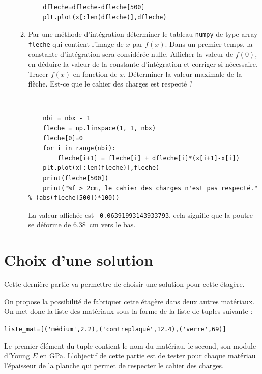 \begin{enumerate}
\begin{enumerate}
\begin{solution}
  \begin{verbatim}
	dfleche=dfleche-dfleche[500]
	plt.plot(x[:len(dfleche)],dfleche)
 \end{verbatim}
\end{solution}
\item Par une méthode d'intégration déterminer le tableau \verb?numpy? de type array \verb?fleche? qui contient l'image de $x$ par $f(x)$. Dans un premier temps, la constante d'intégration sera considérée nulle. Afficher la valeur de $f(0)$, en déduire la valeur de la constante d'intégration et corriger si nécessaire. Tracer $f(x)$ en fonction de $x$. Déterminer la valeur maximale de la flèche. Est-ce que le cahier des charges est respecté ?
 \begin{solution}~\ \\
  \begin{verbatim}
	nbi = nbx - 1
	fleche = np.linspace(1, 1, nbx)
	fleche[0]=0
	for i in range(nbi):
    	fleche[i+1] = fleche[i] + dfleche[i]*(x[i+1]-x[i])
	plt.plot(x[:len(fleche)],fleche)
	print(fleche[500])
	print("%f > 2cm, le cahier des charges n'est pas respecté." % (abs(fleche[500])*100))
 \end{verbatim}
 La valeur affichée est \verb?-0.06391993143933793?, cela signifie que la poutre se déforme de \SI{6.38}{\centi\meter} vers le bas.
\end{solution}
\end{enumerate}
\end{enumerate}

\section*{Choix d'une solution}

Cette dernière partie va permettre de choisir une solution pour cette étagère.

On propose la possibilité de fabriquer cette étagère dans deux autres matériaux. On met donc la liste des matériaux sous la forme de la liste de tuples suivante :

\verb?liste_mat=[('médium',2.2),('contreplaqué',12.4),('verre',69)]?

Le premier élément du tuple contient le nom du matériau, le second, son module d'Young $E$ en \si{\giga\pascal}. L'objectif de cette partie est de tester pour chaque matériau l'épaisseur de la planche qui permet de respecter le cahier des charges.

